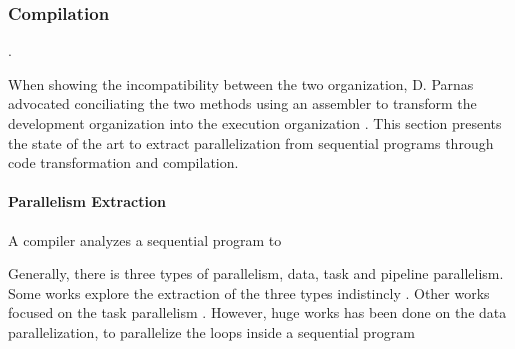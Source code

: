 









\subsubsection{Compilation} \label{chapter3:software-maintainability:performance:compilation}

.

When showing the incompatibility between the two organization, D. Parnas  advocated conciliating the two methods using an assembler to transform the development organization into the execution organization \cite{Parnas1972}.
This section presents the state of the art to extract parallelization from sequential programs through code transformation and compilation.

\paragraph{Parallelism Extraction}

A compiler analyzes a sequential program to 



Generally, there is three types of parallelism, data, task and pipeline parallelism.
Some works explore the extraction of the three types indistincly \cite{Li2012}.
Other works focused on the task parallelism \cite{Rinard1996}.
However, huge works has been done on the data parallelization, to parallelize the loops inside a sequential program \cite{Mauras1989,Amarasinghe1995,Yuki2013,Banerjee2013,Radoi2014}

